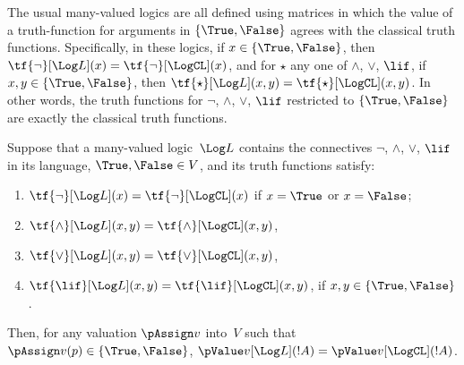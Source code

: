 \documentclass[../../../include/open-logic-section]{subfiles}
\begin{document}

The usual many-valued logics are all defined using matrices in which
the value of a truth-function for arguments in $\{\True, \False\}$
agrees with the classical truth functions. Specifically, in these
logics, if $x \in \{\True, \False\}$, then $\tf{\lnot}[\Log L](x) =
\tf{\lnot}[\LogCL](x)$, and for $\star$ any one of $\land$, $\lor$,
$\lif$, if $x, y \in \{\True, \False\}$, then $\tf{\star}[\Log L](x,y) =
\tf{\star}[\LogCL](x,y)$. In other words, the truth functions for
$\lnot$, $\land$, $\lor$, $\lif$ restricted to $\{\True,\False\}$ are
exactly the classical truth functions.

\begin{prop}
  Suppose that a many-valued logic~$\Log L$ contains the connectives
  $\lnot$, $\land$, $\lor$, $\lif$ in its language, $\True, \False \in
  V$, and its truth
  functions satisfy:
  \begin{enumerate}
    \item{} $\tf{\lnot}[\Log L](x) = \tf{\lnot}[\LogCL](x)$ if $x =
    \True$ or $x = \False$;
    \item{} $\tf{\land}[\Log L](x,y) = \tf{\land}[\LogCL](x,y)$,
    \item{} $\tf{\lor}[\Log L](x,y) = \tf{\lor}[\LogCL](x,y)$,
    \item{} $\tf{\lif}[\Log L](x,y) = \tf{\lif}[\LogCL](x,y)$,
    if $x, y \in \{\True, \False\}$.
  \end{enumerate}
  Then, for any valuation $\pAssign v$ into~$V$ such that $\pAssign
  v(p) \in \{\True,\False\}$, $\pValue v[\Log L](!A) = \pValue
  v[\LogCL](!A)$.
\end{prop}
\end{document}
